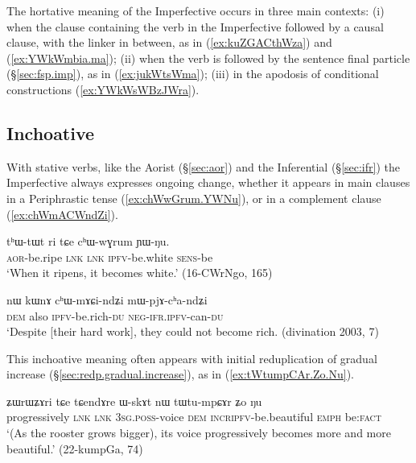 The hortative meaning of the Imperfective occurs in three main contexts: (i) when the clause containing the verb in the Imperfective followed by a causal clause, with the linker  in between, as in (\ref{ex:kuZGACthWza}) and (\ref{ex:YWkWmbia.ma}); (ii) when the verb is followed by the sentence final particle  (§\ref{sec:fsp.imp}), as in (\ref{ex:jukWtsWma}); (iii) in the apodosis of conditional constructions (\ref{ex:YWkWsWBzJWra}).

\subsection{Inchoative} \label{sec:ipfv.inchoative}
With stative verbs, like the Aorist (§\ref{sec:aor}) and the Inferential (§\ref{sec:ifr}) the Imperfective always expresses ongoing change, whether it appears in main clauses in a Periphrastic tense (\ref{ex:chWwGrum.YWNu}), or in a complement clause (\ref{ex:chWmACWndZi}).

\begin{exe}
\ex \label{ex:chWwGrum.YWNu}
\gll tʰɯ-tɯt ri tɕe cʰɯ-wɣrum ɲɯ-ŋu. \\
\textsc{aor}-be.ripe \textsc{lnk} \textsc{lnk} \textsc{ipfv}-be.white \textsc{sens}-be \\
\glt `When it ripens, it becomes white.' (16-CWrNgo, 165)
\end{exe}

\begin{exe}
\ex \label{ex:chWmACWndZi}
\gll  nɯ kɯnɤ cʰɯ-mɤɕi-ndʑi mɯ-pjɤ-cʰa-ndʑi \\
\textsc{dem} also \textsc{ipfv}-be.rich-\textsc{du} \textsc{neg}-\textsc{ifr}.\textsc{ipfv}-can-\textsc{du} \\
\glt `Despite [their hard work], they could not become rich. (divination 2003, 7)
\end{exe}

This inchoative meaning often appears with initial reduplication of gradual increase (§\ref{sec:redp.gradual.increase}), as in (\ref{ex:tWtumpCAr.Zo.Nu}).

\begin{exe}
\ex \label{ex:tWtumpCAr.Zo.Nu}
\gll ʑɯrɯʑɤri tɕe tɕendɤre ɯ-skɤt nɯ tɯ\redp{}tu-mpɕɤr ʑo ŋu  \\
progressively \textsc{lnk} \textsc{lnk} \textsc{3sg}.\textsc{poss}-voice \textsc{dem} \textsc{incr}\redp{}\textsc{ipfv}-be.beautiful \textsc{emph} be:\textsc{fact} \\
\glt `(As the rooster grows bigger), its voice progressively becomes more and more beautiful.' (22-kumpGa, 74)
\end{exe}

